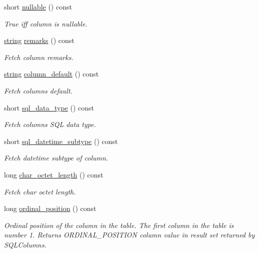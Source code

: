 \begin{DoxyCompactItemize}
short \mbox{\hyperlink{classnanodbc_1_1catalog_1_1columns_a89adcbcb8698c4365066a14438bd7dba}{nullable}} () const
\begin{DoxyCompactList}\small\item\em True iff column is nullable. \end{DoxyCompactList}\item 
\mbox{\hyperlink{namespacenanodbc_abfc0ece56278e590911ec8352774c212}{string}} \mbox{\hyperlink{classnanodbc_1_1catalog_1_1columns_a10f43e080211af896295f5d4e90f74ee}{remarks}} () const
\begin{DoxyCompactList}\small\item\em Fetch column remarks. \end{DoxyCompactList}\item 
\mbox{\hyperlink{namespacenanodbc_abfc0ece56278e590911ec8352774c212}{string}} \mbox{\hyperlink{classnanodbc_1_1catalog_1_1columns_a4b81f871ec4f0bdefe9ee0be831c94dc}{column\+\_\+default}} () const
\begin{DoxyCompactList}\small\item\em Fetch column\textquotesingle{}s default. \end{DoxyCompactList}\item 
short \mbox{\hyperlink{classnanodbc_1_1catalog_1_1columns_a1a9224a4cae53eb55ea436978997f45b}{sql\+\_\+data\+\_\+type}} () const
\begin{DoxyCompactList}\small\item\em Fetch column\textquotesingle{}s S\+QL data type. \end{DoxyCompactList}\item 
short \mbox{\hyperlink{classnanodbc_1_1catalog_1_1columns_a80c8ad5ce70a610f31e93dbfdbdda962}{sql\+\_\+datetime\+\_\+subtype}} () const
\begin{DoxyCompactList}\small\item\em Fetch datetime subtype of column. \end{DoxyCompactList}\item 
long \mbox{\hyperlink{classnanodbc_1_1catalog_1_1columns_ae68cdaf1be0289e1be1fcada433f0aaa}{char\+\_\+octet\+\_\+length}} () const
\begin{DoxyCompactList}\small\item\em Fetch char octet length. \end{DoxyCompactList}\item 
long \mbox{\hyperlink{classnanodbc_1_1catalog_1_1columns_aeb0328b77da7de19c81b392dfebf6eed}{ordinal\+\_\+position}} () const
\begin{DoxyCompactList}\small\item\em Ordinal position of the column in the table. The first column in the table is number 1. Returns O\+R\+D\+I\+N\+A\+L\+\_\+\+P\+O\+S\+I\+T\+I\+ON column value in result set returned by S\+Q\+L\+Columns. \end{DoxyCompactList}\item 

\end{DoxyCompactItemize}

